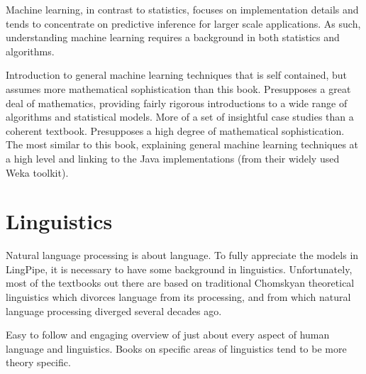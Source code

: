\noindent
Machine learning, in contrast to statistics, focuses on implementation
details and tends to concentrate on predictive inference for larger
scale applications.  As such, understanding machine learning requires
a background in both statistics and algorithms.

\begin{itemize}
%
{Introduction to general machine learning
techniques that is self contained, but assumes more mathematical
sophistication than this book.}
%
{Presupposes a great deal of mathematics, providing
fairly rigorous introductions to a wide range of algorithms and
statistical models.}
%
{More of a set of insightful case studies than a coherent textbook.
Presupposes a high degree of mathematical sophistication.}
%
{The most similar to this book, explaining general machine
learning techniques at a high level and 
linking to the Java implementations (from their widely used Weka toolkit).}
%
\end{itemize}




\section{Linguistics}

\noindent
Natural language processing is about language.  To fully appreciate
the models in LingPipe, it is necessary to have some background in
linguistics.  Unfortunately, most of the textbooks out there are based
on traditional Chomskyan theoretical linguistics which divorces
language from its processing, and from which natural language
processing diverged several decades ago.

\begin{itemize}
%
{Easy to follow and engaging overview of just about every
aspect of human language and linguistics.  Books on specific areas of
linguistics tend to be more theory specific.}
%
\end{itemize}


